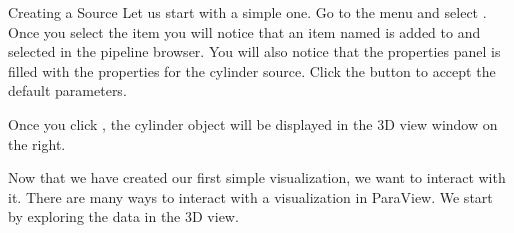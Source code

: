 \begin{exercise}{Creating a Source}
  \label{ex:CreatingASource}%
  Let us start with a simple one.  Go to the  menu and select
  .  Once you select the  item you will notice
  that an item named  is added to and selected in the
  pipeline browser.  You will also notice that the properties panel is
  filled with the properties for the cylinder source.  
  Click the  button \apply to accept the default parameters.

  Once you click , the cylinder object will be displayed in the
  3D view window on the right.
\end{exercise}

Now that we have created our first simple visualization, we want to
interact with it. There are many ways to interact with a visualization in
ParaView. We start by exploring the data in the 3D view.

